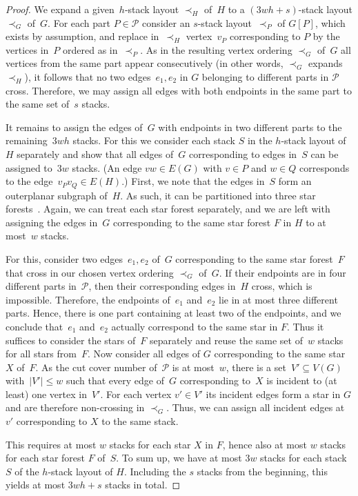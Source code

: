 \documentclass{article}
\newcommand{\calP}{\ensuremath{\mathcal{P}}\xspace}
\begin{document}
\begin{proof}
    We expand a given~$h$-stack layout $\prec_H$ of~$H$ to a $(3wh + s)$-stack layout $\prec_G$ of~$G$.
    For each part $P \in \calP$ consider an $s$-stack layout~$\prec_P$ of $ G[P] $, which exists by assumption,
    and replace in~$\prec_H$ vertex~$v_P$ corresponding to $P$ by the vertices in~$P$ ordered as in~$\prec_P$.
    As in the resulting vertex ordering $\prec_G$ of~$G$ all vertices from the same part appear consecutively (in other words, $\prec_G$ expands $\prec_H$), it follows that no two edges~$e_1, e_2$ in $G$ belonging to different parts in $\calP$ cross.
    Therefore, we may assign all edges with both endpoints in the same part to the same set of~$s$ stacks.

    It remains to assign the edges of~$G$ with endpoints in two different parts to the remaining~$3wh$ stacks.
    For this we consider each stack $S$ in the $h$-stack layout of~$H$ separately and show that all edges of~$G$ 
    corresponding to edges in~$S$
    can be assigned to~$3w$ stacks.
    (An edge $vw \in E(G)$ with $v \in P$ and $w \in Q$ corresponds to the edge~$v_Pv_Q \in E(H)$.)
    First, we note that the edges in~$S$ form an outerplanar subgraph of~$H$.
    As such, it can be partitioned into three star forests~\cite{Hakimi1996_StarAboricity}.
    Again, we can treat each star forest separately, and we are left with assigning the edges in~$G$ corresponding to the same star forest $F$ in $H$ to at most~$w$ stacks.

    For this, consider two edges~$e_1, e_2$ of~$G$ corresponding to the same star forest~$F$ that cross in our chosen vertex ordering $\prec_G$ of~$G$.
    If their endpoints are in four different parts in~$\calP$, then their corresponding edges in~$H$ cross, which is impossible.
    Therefore, the endpoints of~$e_1$ and~$e_2$ lie in at most three different parts.
    Hence, there is one part containing at least two of the endpoints, and we conclude that~$e_1$ and~$e_2$ actually correspond to the same star in $F$.
    Thus it suffices to consider the stars of~$F$ separately and reuse the same set of~$w$ stacks for all stars from~$F$.
    Now consider all edges of $G$ corresponding to the same star~$X$ of~$F$.
    As the cut cover number of~$\calP$ is at most~$w$, there is a set~$V' \subseteq V(G)$ with~$|V'| \leq w$ such that every edge of~$G$ corresponding to~$X$ is incident to (at least) one vertex in~$V'$.
    For each vertex $v' \in V'$ its incident edges form a star in $G$ and are therefore non-crossing in $\prec_G$.
    Thus, we can assign all incident edges at $v'$ corresponding to $X$ to the same stack.
    
    This requires at most $w$ stacks for each star $X$ in $F$, hence also at most $w$ stacks for each star forest $F$ of~$S$. To sum up, we have at most $3w$ stacks for each stack $S$ of the $h$-stack layout of $H$.
    Including the $s$ stacks from the beginning, this yields at most $3wh + s$ stacks in total.
\end{proof}
\end{document}
